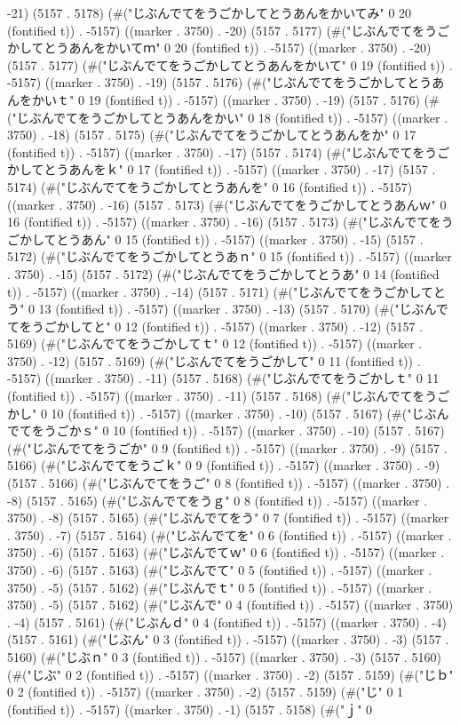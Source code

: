 {{-21) (5157 . 5178) (#("じぶんでてをうごかしてとうあんをかいてみ" 0 20 (fontified t)) . -5157) ((marker . 3750) . -20) (5157 . 5177) (#("じぶんでてをうごかしてとうあんをかいてｍ" 0 20 (fontified t)) . -5157) ((marker . 3750) . -20) (5157 . 5177) (#("じぶんでてをうごかしてとうあんをかいて" 0 19 (fontified t)) . -5157) ((marker . 3750) . -19) (5157 . 5176) (#("じぶんでてをうごかしてとうあんをかいｔ" 0 19 (fontified t)) . -5157) ((marker . 3750) . -19) (5157 . 5176) (#("じぶんでてをうごかしてとうあんをかい" 0 18 (fontified t)) . -5157) ((marker . 3750) . -18) (5157 . 5175) (#("じぶんでてをうごかしてとうあんをか" 0 17 (fontified t)) . -5157) ((marker . 3750) . -17) (5157 . 5174) (#("じぶんでてをうごかしてとうあんをｋ" 0 17 (fontified t)) . -5157) ((marker . 3750) . -17) (5157 . 5174) (#("じぶんでてをうごかしてとうあんを" 0 16 (fontified t)) . -5157) ((marker . 3750) . -16) (5157 . 5173) (#("じぶんでてをうごかしてとうあんｗ" 0 16 (fontified t)) . -5157) ((marker . 3750) . -16) (5157 . 5173) (#("じぶんでてをうごかしてとうあん" 0 15 (fontified t)) . -5157) ((marker . 3750) . -15) (5157 . 5172) (#("じぶんでてをうごかしてとうあｎ" 0 15 (fontified t)) . -5157) ((marker . 3750) . -15) (5157 . 5172) (#("じぶんでてをうごかしてとうあ" 0 14 (fontified t)) . -5157) ((marker . 3750) . -14) (5157 . 5171) (#("じぶんでてをうごかしてとう" 0 13 (fontified t)) . -5157) ((marker . 3750) . -13) (5157 . 5170) (#("じぶんでてをうごかしてと" 0 12 (fontified t)) . -5157) ((marker . 3750) . -12) (5157 . 5169) (#("じぶんでてをうごかしてｔ" 0 12 (fontified t)) . -5157) ((marker . 3750) . -12) (5157 . 5169) (#("じぶんでてをうごかして" 0 11 (fontified t)) . -5157) ((marker . 3750) . -11) (5157 . 5168) (#("じぶんでてをうごかしｔ" 0 11 (fontified t)) . -5157) ((marker . 3750) . -11) (5157 . 5168) (#("じぶんでてをうごかし" 0 10 (fontified t)) . -5157) ((marker . 3750) . -10) (5157 . 5167) (#("じぶんでてをうごかｓ" 0 10 (fontified t)) . -5157) ((marker . 3750) . -10) (5157 . 5167) (#("じぶんでてをうごか" 0 9 (fontified t)) . -5157) ((marker . 3750) . -9) (5157 . 5166) (#("じぶんでてをうごｋ" 0 9 (fontified t)) . -5157) ((marker . 3750) . -9) (5157 . 5166) (#("じぶんでてをうご" 0 8 (fontified t)) . -5157) ((marker . 3750) . -8) (5157 . 5165) (#("じぶんでてをうｇ" 0 8 (fontified t)) . -5157) ((marker . 3750) . -8) (5157 . 5165) (#("じぶんでてをう" 0 7 (fontified t)) . -5157) ((marker . 3750) . -7) (5157 . 5164) (#("じぶんでてを" 0 6 (fontified t)) . -5157) ((marker . 3750) . -6) (5157 . 5163) (#("じぶんでてｗ" 0 6 (fontified t)) . -5157) ((marker . 3750) . -6) (5157 . 5163) (#("じぶんでて" 0 5 (fontified t)) . -5157) ((marker . 3750) . -5) (5157 . 5162) (#("じぶんでｔ" 0 5 (fontified t)) . -5157) ((marker . 3750) . -5) (5157 . 5162) (#("じぶんで" 0 4 (fontified t)) . -5157) ((marker . 3750) . -4) (5157 . 5161) (#("じぶんｄ" 0 4 (fontified t)) . -5157) ((marker . 3750) . -4) (5157 . 5161) (#("じぶん" 0 3 (fontified t)) . -5157) ((marker . 3750) . -3) (5157 . 5160) (#("じぶｎ" 0 3 (fontified t)) . -5157) ((marker . 3750) . -3) (5157 . 5160) (#("じぶ" 0 2 (fontified t)) . -5157) ((marker . 3750) . -2) (5157 . 5159) (#("じｂ" 0 2 (fontified t)) . -5157) ((marker . 3750) . -2) (5157 . 5159) (#("じ" 0 1 (fontified t)) . -5157) ((marker . 3750) . -1) (5157 . 5158) (#("ｊ" 0 }}
